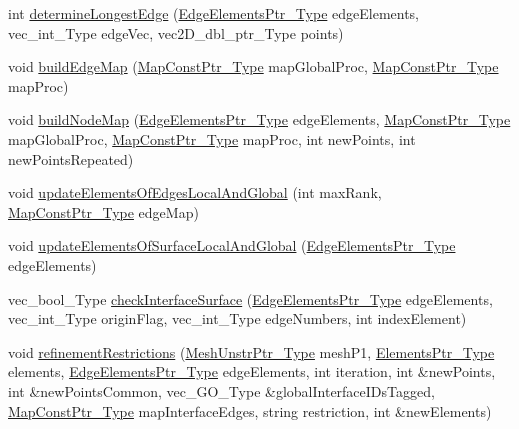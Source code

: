 \begin{DoxyCompactItemize}
\item 
int \hyperlink{classFEDD_1_1RefinementFactory_a383adbeffceada793b6805fb02fa5568}{determine\+Longest\+Edge} (\hyperlink{classFEDD_1_1RefinementFactory_ae5285e990ec4632d6188a1280627ad13}{Edge\+Elements\+Ptr\+\_\+\+Type} edge\+Elements, vec\+\_\+int\+\_\+\+Type edge\+Vec, vec2\+D\+\_\+dbl\+\_\+ptr\+\_\+\+Type points)
\item 
void \hyperlink{classFEDD_1_1RefinementFactory_a4294d0901e6691203b9043bb2f9c6ac6}{build\+Edge\+Map} (\hyperlink{classFEDD_1_1RefinementFactory_a8256ccdf1b2a5c977ddc011f4e8eb8d3}{Map\+Const\+Ptr\+\_\+\+Type} map\+Global\+Proc, \hyperlink{classFEDD_1_1RefinementFactory_a8256ccdf1b2a5c977ddc011f4e8eb8d3}{Map\+Const\+Ptr\+\_\+\+Type} map\+Proc)
\item 
void \hyperlink{classFEDD_1_1RefinementFactory_abeca9755a1bd393c36c792a78c6779e9}{build\+Node\+Map} (\hyperlink{classFEDD_1_1RefinementFactory_ae5285e990ec4632d6188a1280627ad13}{Edge\+Elements\+Ptr\+\_\+\+Type} edge\+Elements, \hyperlink{classFEDD_1_1RefinementFactory_a8256ccdf1b2a5c977ddc011f4e8eb8d3}{Map\+Const\+Ptr\+\_\+\+Type} map\+Global\+Proc, \hyperlink{classFEDD_1_1RefinementFactory_a8256ccdf1b2a5c977ddc011f4e8eb8d3}{Map\+Const\+Ptr\+\_\+\+Type} map\+Proc, int new\+Points, int new\+Points\+Repeated)
\item 
void \hyperlink{classFEDD_1_1RefinementFactory_a2ebf82a5deb92e26a48805fd470f6840}{update\+Elements\+Of\+Edges\+Local\+And\+Global} (int max\+Rank, \hyperlink{classFEDD_1_1RefinementFactory_a8256ccdf1b2a5c977ddc011f4e8eb8d3}{Map\+Const\+Ptr\+\_\+\+Type} edge\+Map)
\item 
void \hyperlink{classFEDD_1_1RefinementFactory_a8f295b405de2c056298b695bea51887b}{update\+Elements\+Of\+Surface\+Local\+And\+Global} (\hyperlink{classFEDD_1_1RefinementFactory_ae5285e990ec4632d6188a1280627ad13}{Edge\+Elements\+Ptr\+\_\+\+Type} edge\+Elements)
\item 
vec\+\_\+bool\+\_\+\+Type \hyperlink{classFEDD_1_1RefinementFactory_a97003a4445b40ac91728639de432a449}{check\+Interface\+Surface} (\hyperlink{classFEDD_1_1RefinementFactory_ae5285e990ec4632d6188a1280627ad13}{Edge\+Elements\+Ptr\+\_\+\+Type} edge\+Elements, vec\+\_\+int\+\_\+\+Type origin\+Flag, vec\+\_\+int\+\_\+\+Type edge\+Numbers, int index\+Element)
\item 
void \hyperlink{classFEDD_1_1RefinementFactory_a6fa94c91b750950e2bbe53c3540eda08}{refinement\+Restrictions} (\hyperlink{classFEDD_1_1RefinementFactory_a1a278d01c278972af01f2996247af8ac}{Mesh\+Unstr\+Ptr\+\_\+\+Type} mesh\+P1, \hyperlink{classFEDD_1_1RefinementFactory_a0994b5b7b6d080048673941251999f2e}{Elements\+Ptr\+\_\+\+Type} elements, \hyperlink{classFEDD_1_1RefinementFactory_ae5285e990ec4632d6188a1280627ad13}{Edge\+Elements\+Ptr\+\_\+\+Type} edge\+Elements, int iteration, int \&new\+Points, int \&new\+Points\+Common, vec\+\_\+\+G\+O\+\_\+\+Type \&global\+Interface\+I\+Ds\+Tagged, \hyperlink{classFEDD_1_1RefinementFactory_a8256ccdf1b2a5c977ddc011f4e8eb8d3}{Map\+Const\+Ptr\+\_\+\+Type} map\+Interface\+Edges, string restriction, int \&new\+Elements)

\end{DoxyCompactItemize}
